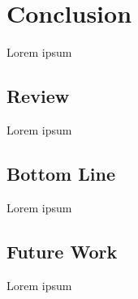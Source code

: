 \section{Conclusion}
Lorem ipsum

\subsection{Review}
Lorem ipsum

\subsection{Bottom Line}
Lorem ipsum

\subsection{Future Work}
Lorem ipsum